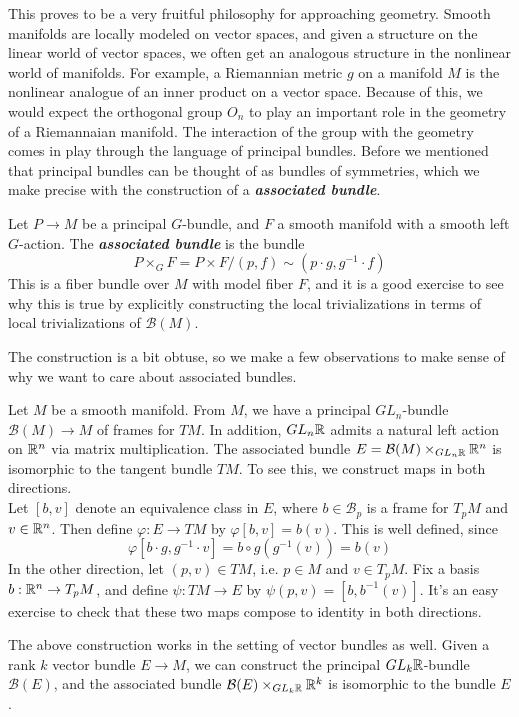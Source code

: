 \documentclass[abstract=on,twoside]{scrreprt}
\begin{document}
This proves to be a very fruitful philosophy for approaching geometry. Smooth manifolds
are locally modeled on vector spaces, and given a structure on the linear world
of vector spaces, we often get an analogous structure in the nonlinear world of
manifolds. For example, a Riemannian metric $g$ on a manifold $M$ is the nonlinear
analogue of an inner product on a vector space. Because of this, we would expect
the orthogonal group $O_n$ to play an important role in the geometry of a Riemannaian
manifold. The interaction of the group with the geometry comes in play through the
language of principal bundles. Before we mentioned that principal bundles can be
thought of as bundles of symmetries, which we make precise with the construction of
a \textbf{\textit{associated bundle}}.
%
\begin{definition}
Let $P \to M$ be a principal $G$-bundle, and $F$ a smooth manifold with a smooth
left $G$-action. The \textbf{\textit{associated bundle}} is the bundle
\[
P \times_G F = P \times F / (p, f) \sim (p \cdot g, g^{-1} \cdot f)
\]
This is a fiber bundle over $M$ with model fiber $F$, and it is a good exercise to see
why this is true by explicitly constructing the local trivializations in terms
of local trivializations of $\mathcal{B}(M)$.
\end{definition}
%
The construction is a bit obtuse, so we make a few observations to make sense of
why we want to care about associated bundles.
%
\begin{example}
Let $M$ be a smooth manifold. From $M$, we have a principal $GL_n$-bundle
$\mathcal{B}(M) \to M$ of frames for $TM$. In addition, $GL_n\mathbb{R}$ admits a natural
left action on $\mathbb{R}^n$ via matrix multiplication. The associated bundle
$E = \mathcal{B}(M) \times_{GL_n\mathbb{R}} \mathbb{R}^n$ is isomorphic to the tangent bundle
$TM$. To see this, we construct maps in both directions. \\

Let $[b, v]$ denote an equivalence class in $E$, where $b \in \mathcal{B}_p$ is a
frame for $T_pM$ and $v \in \mathbb{R}^n$. Then define $\varphi : E \to TM$ by
$\varphi[b,v] = b(v)$. This is well defined, since
\[
\varphi[b\cdot g, g^{-1}\cdot v] = b \circ g(g^{-1}(v)) = b(v)
\]
In the other direction, let $(p,v) \in TM$, i.e. $p \in M$ and $v \in T_pM$. Fix
a basis $b : \mathbb{R}^n \to T_pM$, and define $\psi : TM \to E$ by
$\psi(p,v) = [b,b^{-1}(v)]$. It's an easy exercise to check that these two maps compose
to identity in both directions.
\end{example}
%
The above construction works in the setting of vector bundles as well. Given
a rank $k$ vector bundle $E \to M$, we can construct the principal $GL_k\mathbb{R}$-bundle
$\mathcal{B}(E)$, and the associated bundle $\mathcal{B}(E) \times_{GL_k\mathbb{R}} \mathbb{R}^k$ is
isomorphic to the bundle $E$. \\
\end{document}
